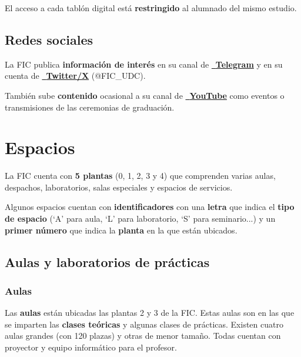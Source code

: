 \begin{warningBox}
    El acceso a cada tablón digital está \textbf{restringido} al alumnado del mismo estudio.
\end{warningBox}

\subsection{Redes sociales}

La \acrshort{FIC} publica \textbf{información de interés} en su canal de \href{https://t.me/+LHa3QApmGskyNDFk}{~\textbf{Telegram}} y en su cuenta de \href{https://x.com/FIC_UDC}{~\textbf{Twitter/X}} (@FIC\_UDC).

También sube \textbf{contenido} ocasional a su canal de \href{https://www.youtube.com/@facultaddeinformaticadeaco4211}{~\textbf{YouTube}} como eventos o transmisiones de las ceremonias de graduación.


\section{Espacios}

La \acrshort{FIC} cuenta con \textbf{5 plantas} (0, 1, 2, 3 y 4) que comprenden varias aulas, despachos, laboratorios, salas especiales y espacios de servicios.

\begin{infoBox}
    Algunos espacios cuentan con \textbf{identificadores} con una \textbf{letra} que indica el \textbf{tipo de espacio} (`A' para aula, `L' para laboratorio, `S' para seminario...) y un \textbf{primer número} que indica la \textbf{planta} en la que están ubicados.
\end{infoBox}

\subsection{Aulas y laboratorios de prácticas}

\subsubsection{Aulas}

Las \textbf{aulas} están ubicadas las plantas 2 y 3 de la 
\acrshort{FIC}. Estas aulas son en las que se imparten las \textbf{clases teóricas} y algunas clases de prácticas. Existen cuatro aulas grandes (con 120 plazas) y otras de menor tamaño. Todas cuentan con proyector y equipo informático para el profesor.

